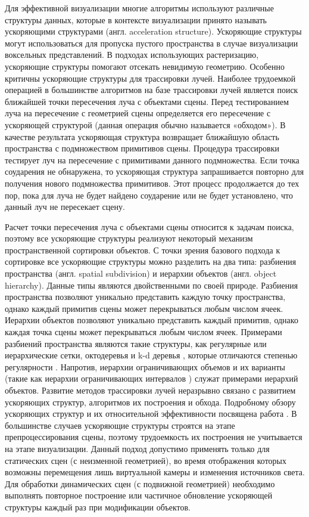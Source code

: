 Для эффективной визуализации многие алгоритмы используют различные структуры данных, которые в контексте визуализации принято называть ускоряющими структурами (англ. acceleration structure). Ускоряющие структуры могут использоваться для пропуска пустого пространства в случае визуализации воксельных представлений. В подходах использующих растеризацию, ускоряющие структуры помогают отсекать невидимую геометрию. Особенно критичны ускоряющие структуры для трассировки лучей. Наиболее трудоемкой операцией в большинстве алгоритмов на базе трассировки лучей является поиск ближайшей точки пересечения луча с объектами сцены. Перед тестированием луча на пересечение с геометрией сцены определяется его пересечение с ускоряющей структурой (данная операция обычно называется «обходом»). В качестве результата ускоряющая структура возвращает ближайшую область пространства с подмножеством примитивов сцены. Процедура трассировки тестирует луч на пересечение с примитивами данного подмножества. Если точка соударения не обнаружена, то ускоряющая структура запрашивается повторно для получения нового подмножества примитивов. Этот процесс продолжается до тех пор, пока для луча не будет найдено соударение или не будет установлено, что данный луч не пересекает сцену.

Расчет точки пересечения луча с объектами сцены относится к задачам поиска, поэтому все ускоряющие структуры реализуют некоторый механизм пространственной сортировки объектов. С точки зрения базового подхода к сортировке все ускоряющие структуры можно разделить на два типа: разбиения пространства (англ. spatial subdivision) и иерархии объектов (англ. object hierarchy). Данные типы являются двойственными по своей природе. Разбиения пространства позволяют уникально представить каждую точку пространства, однако каждый примитив сцены может перекрываться любым числом ячеек. Иерархии объектов позволяют уникально представить каждый примитив, однако каждая точка сцены может перекрываться любым числом ячеек. Примерами разбиений пространства являются такие структуры, как регулярные \cite{fujimoto1986arts} или иерархические \cite{cosenza2008survey} сетки, октодеревья \cite{glassner1984space} и k-d деревья \cite{bentley1975multidimensional}, которые отличаются степенью регулярности \cite{havran2007relation}. Напротив, иерархии ограничивающих объемов \cite{rubin19803} и их варианты (такие как иерархии ограничивающих интервалов \cite{ooi1987spatial}) служат примерами иерархий объектов. Развитие методов трассировки лучей неразрывно связано с развитием ускоряющих структур, алгоритмов их построения и обхода. Подробному обзору ускоряющих структур и их относительной эффективности посвящена работа \cite{havran2000statistical}.
В большинстве случаев ускоряющие структуры строятся на этапе препроцессирования сцены, поэтому трудоемкость их построения не учитывается на этапе визуализации. Данный подход допустимо применять только для статических сцен (с неизменной геометрией), во время отображения которых возможны перемещения лишь виртуальной камеры и изменения источников света. Для обработки динамических сцен (с подвижной геометрией) необходимо выполнять повторное построение или частичное обновление ускоряющей структуры каждый раз при модификации объектов.
